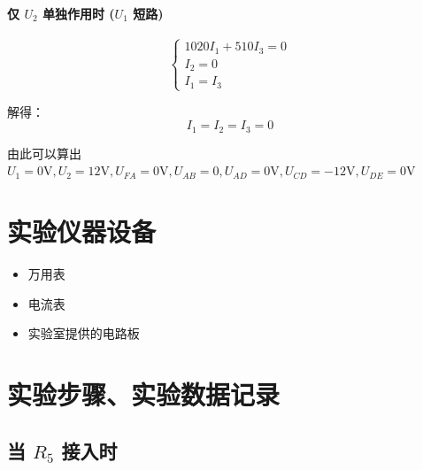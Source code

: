 \documentclass{Report} %
\begin{document}
\paragraph{仅 $U_2$ 单独作用时 ($U_1$ 短路)}
\begin{equation}
\begin{cases}
    1020I_1 + 510I_3 = 0 \\
    I_2 = 0 \\
    I_1 = I_3
\end{cases}
\end{equation}

解得：
\[I_1 = I_2 = I_3 = 0\]

由此可以算出 $U_1 = 0\text{V}, U_2 = 12\text{V}, U_{FA} = 0\text{V}, U_{AB} = 0, U_{AD} = 0\text{V}, U_{CD} = -12\text{V}, U_{DE} = 0\text{V}$

\section{实验仪器设备}
\begin{itemize}
    \item 万用表
    \item 电流表
    \item 实验室提供的电路板
\end{itemize}
\section{实验步骤、实验数据记录}
\subsection{当 $R_5$ 接入时}

\begin{table}[H]
\centering
\caption{$U_1$ 单独作用}
\label{tab:U1_alone}
\end{table}
\end{document}
